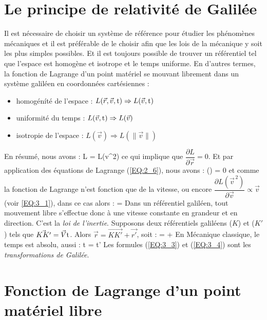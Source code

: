 \section{Le principe de relativit\'e de Galil\'ee}

Il est n\'ecessaire de choisir un syst\`eme de r\'ef\'erence pour \'etudier les ph\'enom\`enes m\'ecaniques et il est pr\'ef\'erable de le choisir afin que les lois de la m\'ecanique y soit les plus simples possibles. Et il est toujours possible de trouver un r\'ef\'erentiel tel que l'espace est homog\`ene et isotrope et le temps uniforme. En d'autres termes, la fonction de Lagrange d'un point mat\'eriel se mouvant librement dans un syst\`eme galil\'een en coordonn\'ees cart\'esiennes :
\begin{itemize}
	\item homog\'en\'it\'e de l'espace : $L(\vec{r},\vec{v},{\rm t}) \Rightarrow L(\vec{v},{\rm t})$
	\item uniformit\'e du temps : $L(\vec{v},{\rm t}) \Rightarrow L(\vec{v})$
	\item isotropie de l'espace : $L(\vec{v}) \Rightarrow L(\lVert\vec{v}\rVert)$
\end{itemize}
En r\'esum\'e, nous avons :
\be
	L = L(v^{2}) \label{EQ:3_1}
\ee
ce qui implique que $\dfrac{\partial L}{\partial \vec{r}} = 0$. Et par application des \'equations de Lagrange (\ref{EQ:2_6}), nous avons :
\be
	\left(\right) = 0
\ee
et comme la fonction de Lagrange n'est fonction que de la vitesse, ou encore $\dfrac{\partial L({\vec{v}}^{\,2})}{\partial \vec{v}} \propto \vec{v}$ (voir \ref{EQ:3_1}), dans ce cas alors :
\be
	 =  \label{EQ:3_2}
\ee
Dans un r\'ef\'erentiel galil\'een, tout mouvement libre s'effectue donc \`a une vitesse constante en grandeur et en direction. C'est la \emph{loi de l'inertie}. Supposons deux r\'ef\'erentiels galil\'eens ($K$) et ($K'$) tels que $\vec{KK'}=\vec{V}{\rm t}$. Alors $\vec{r}=\vec{KK'}+\vec{r'}$, soit :
\be
	 =  +  \label{EQ:3_3}
\ee
En M\'ecanique classique, le temps est absolu, aussi :
\be
	{\rm t} = {\rm t'} \label{EQ:3_4}
\ee
Les formules (\ref{EQ:3_3}) et (\ref{EQ:3_4}) sont les \emph{transformations de Galil\'ee}.

\section{Fonction de Lagrange d'un point mat\'eriel libre}